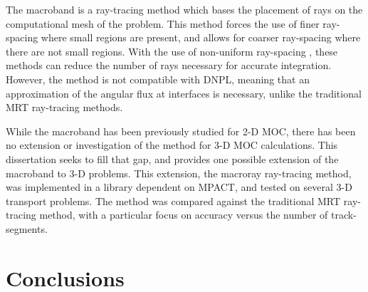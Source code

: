 {{{      The macroband \cite{Villarino1992,Petkov1999,Yamamoto2005,Fevotte2007} is a ray-tracing method which bases the placement of rays on the computational mesh of the problem.
      This method forces the use of finer ray-spacing where small regions are present, and allows for coarser ray-spacing where there are not small regions.
      With the use of non-uniform ray-spacing \cite{Yamamoto2005}, these methods can reduce the number of rays necessary for accurate integration.
      However, the method is not compatible with \acf{DNPL}, meaning that an approximation of the angular flux at interfaces is necessary, unlike the traditional \acf{MRT} ray-tracing methods.

      While the macroband has been previously studied for 2-D \ac{MOC}, there has been no extension or investigation of the method for 3-D \ac{MOC} calculations.
      This dissertation seeks to fill that gap, and provides one possible extension of the macroband to 3-D problems.
      This extension, the macroray ray-tracing method, was implemented in a library dependent on MPACT, and tested on several 3-D transport problems.
      The method was compared against the traditional \ac{MRT} ray-tracing method, with a particular focus on accuracy versus the number of track-segments.
    }
  }

  \section{Conclusions}{\label{sec:Conclusions}



}}
